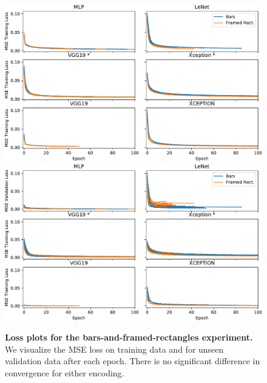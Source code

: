 \documentclass[journal]{vgtc}                %
\begin{document}
\begin{figure}[p]
	\centering
	  \includegraphics[width=\linewidth]{../gfx/figure12_training_loss.pdf}
	  \includegraphics[width=\linewidth]{../gfx/figure12_val_loss.pdf}
  \caption{\textbf{Loss plots for the bars-and-framed-rectangles experiment.} We visualize the MSE loss on training data and for unseen validation data after each epoch. There is no significant difference in convergence for either encoding.}
	\label{fig:fig12_loss}
\end{figure}
\end{document}
